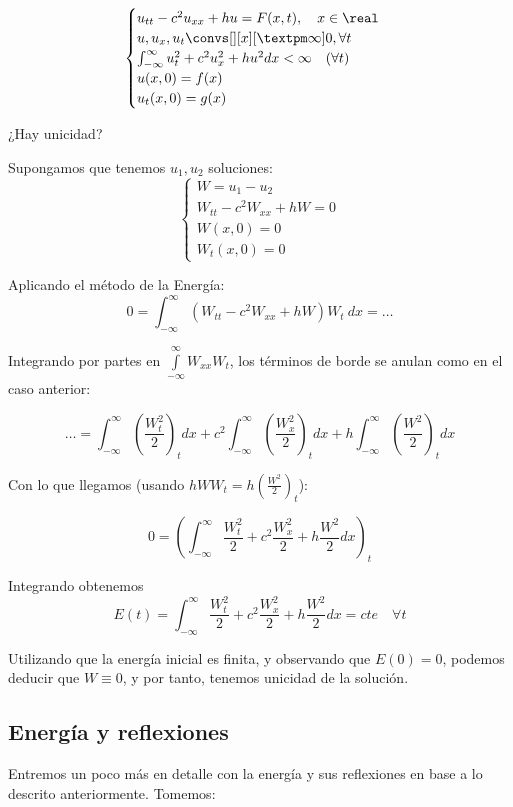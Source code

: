 			\begin{problem}
				\[\begin{cases}
					u_{tt} - c^2 u_{xx} + hu = F(x,t), \quad x \in \real \\
					u, u_x, u_t \convs[ ][x][±\infty] 0, \forall t\\
					\int_{-\infty}^\infty u_t^2 + c^2 u_x^2 + hu^2 dx < \infty \quad (\forall t) \\
					u(x,0) = f(x) \\
					u_t(x,0) = g(x)
				\end{cases}\]

				¿Hay unicidad?

				\solution

				Supongamos que tenemos $u_1,u_2$ soluciones:
				\[\begin{cases}
					W = u_1 - u_2 \\
					W_{tt} - c^2 W_{xx} + h W = 0\\
					W(x,0) = 0\\
					W_t(x,0)=0
				\end{cases}\]

				Aplicando el método de la Energía:
				\[ 0 = \int_{-\infty}^\infty (W_{tt} - c^2 W_{xx} + h W)W_t\ dx = … \]

				Integrando por partes en $\int\limits_{-\infty}^\infty W_{xx} W_{t}$, los términos de borde se anulan como en el caso anterior:

				\[ … = \int_{-\infty}^{\infty}  \left(\frac{W_t^2}{2}\right)_t dx + c^2 \int_{-\infty}^\infty \left(\frac{W_x^2}{2}\right)_t dx + h \int_{-\infty}^\infty \left(\frac{W^2}{2}\right)_t dx \]

				Con lo que llegamos (usando $hWW_t = h (\frac{W^2}{2})_t$):

				\[ 0 = \left(\int_{-\infty}^\infty  \frac{W_t^2}{2} + c^2 \frac{W_x^2}{2} + h \frac{W^2}{2} dx \right)_t\]

				Integrando obtenemos
				\[ E(t) = \int_{-\infty}^{\infty} \frac{W_t^2}{2} + c^2 \frac{W_x^2}{2} + h \frac{W^2}{2} dx = cte \quad \forall t \]

				Utilizando que la energía inicial es finita, y observando que $E(0) = 0$, podemos deducir que $W \equiv 0$, y por tanto, tenemos unicidad de la solución.

			\end{problem}

			\subsection{Energía y reflexiones}
			Entremos un poco más en detalle con la energía y sus reflexiones en base a lo descrito anteriormente. Tomemos:

